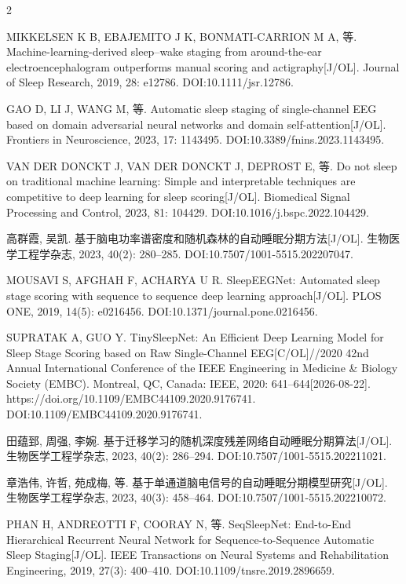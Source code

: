 \documentclass[UTF8,zihao=5,fontset=none]{ctexart}
\begin{document}
\begin{multicols}{2}
{\makebox[25.2pt][l]{[37]}MIKKELSEN K B, EBAJEMITO J K, BONMATI-CARRION M A, 等. Machine-learning-derived sleep–wake staging from around-the-ear electroencephalogram outperforms manual scoring and actigraphy[J/OL]. Journal of Sleep Research, 2019, 28: e12786. DOI:10.1111/jsr.12786.\par
\makebox[25.2pt][l]{[38]}GAO D, LI J, WANG M, 等. Automatic sleep staging of single-channel EEG based on domain adversarial neural networks and domain self-attention[J/OL]. Frontiers in Neuroscience, 2023, 17: 1143495. DOI:10.3389/fnins.2023.1143495.\par
\makebox[25.2pt][l]{[39]}VAN DER DONCKT J, VAN DER DONCKT J, DEPROST E, 等. Do not sleep on traditional machine learning: Simple and interpretable techniques are competitive to deep learning for sleep scoring[J/OL]. Biomedical Signal Processing and Control, 2023, 81: 104429. DOI:10.1016/j.bspc.2022.104429.\par
\makebox[25.2pt][l]{[40]}高群霞, 吴凯. 基于脑电功率谱密度和随机森林的自动睡眠分期方法[J/OL]. 生物医学工程学杂志, 2023, 40(2): 280--285. DOI:10.7507/1001-5515.202207047.\par
\makebox[25.2pt][l]{[41]}MOUSAVI S, AFGHAH F, ACHARYA U R. SleepEEGNet: Automated sleep stage scoring with sequence to sequence deep learning approach[J/OL]. PLOS ONE, 2019, 14(5): e0216456. DOI:10.1371/journal.pone.0216456.\par
\makebox[25.2pt][l]{[42]}SUPRATAK A, GUO Y. TinySleepNet: An Efficient Deep Learning Model for Sleep Stage Scoring based on Raw Single-Channel EEG[C/OL]//2020 42nd Annual International Conference of the IEEE Engineering in Medicine \& Biology Society (EMBC). Montreal, QC, Canada: IEEE, 2020: 641--644[2026-08-22]. https://doi.org/10.1109/EMBC44109.2020.9176741. DOI:10.1109/EMBC44109.2020.9176741.\par
\makebox[25.2pt][l]{[43]}田蕴郅, 周强, 李婉. 基于迁移学习的随机深度残差网络自动睡眠分期算法[J/OL]. 生物医学工程学杂志, 2023, 40(2): 286--294. DOI:10.7507/1001-5515.202211021.\par
\makebox[25.2pt][l]{[44]}章浩伟, 许哲, 苑成梅, 等. 基于单通道脑电信号的自动睡眠分期模型研究[J/OL]. 生物医学工程学杂志, 2023, 40(3): 458--464. DOI:10.7507/1001-5515.202210072.\par
\makebox[25.2pt][l]{[45]}PHAN H, ANDREOTTI F, COORAY N, 等. SeqSleepNet: End-to-End Hierarchical Recurrent Neural Network for Sequence-to-Sequence Automatic Sleep Staging[J/OL]. IEEE Transactions on Neural Systems and Rehabilitation Engineering, 2019, 27(3): 400--410. DOI:10.1109/tnsre.2019.2896659.\par
}
\end{multicols}
\end{document}
